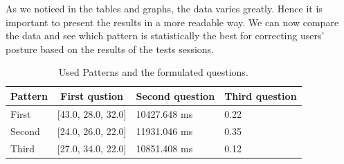 \documentclass[sigconf]{acmart}
\begin{document}
As we noticed in the tables and graphs, the data varies greatly. Hence it is important to present the results in a more readable way. We can now compare the data and see which pattern is statistically the best for correcting users’ posture based on the results of the tests sessions.

\begin{table}[]
\centering
\caption{Used Patterns and the formulated questions.}
\label{my-label}
\begin{tabular}{|l|l|l|l|}
\hline
Pattern & \multicolumn{1}{c|}{\textbf{First qustion}} & \multicolumn{1}{c|}{\textbf{Second question}} & \multicolumn{1}{c|}{\textbf{Third question}} \\ \hline
First   &  [43.0, 28.0, 32.0] &	10427.648 ms&	0.22                          \\ \hline
Second  &  [24.0, 26.0, 22.0]               &       11931.046 ms                                       &     0.35                                           \\ \hline
Third   &  [27.0, 34.0, 22.0]                          &       10851.408 ms                           &               0.12                            \\ \hline
\end{tabular}
\end{table}





\pagebreak

\pagebreak

\pagebreak


\end{document}
